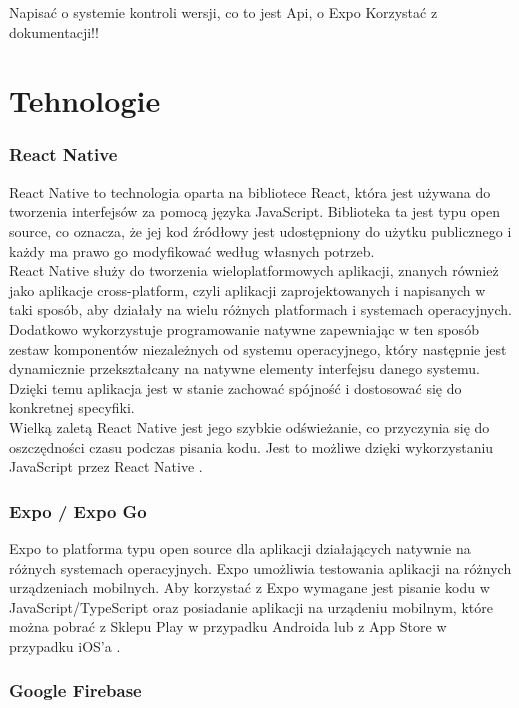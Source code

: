 Napisać o systemie kontroli wersji, co to jest Api, o Expo
Korzystać z dokumentacji!!\\

\section{Tehnologie}

\subsubsection*{\textbf{React Native}}
\phantom{Th}
React Native to technologia oparta na bibliotece React, 
która jest używana do tworzenia interfejsów za pomocą języka JavaScript. 
Biblioteka ta jest typu open source, co oznacza, że jej kod źródłowy jest udostępniony 
do użytku publicznego i każdy ma prawo go modyfikować według własnych potrzeb.\\

React Native służy do tworzenia wieloplatformowych aplikacji, znanych również jako aplikacje cross-platform, 
czyli aplikacji zaprojektowanych i napisanych w taki sposób, aby działały na wielu różnych platformach i systemach operacyjnych. 
Dodatkowo wykorzystuje programowanie natywne zapewniając w ten sposób zestaw komponentów niezależnych od systemu operacyjnego, 
który następnie jest dynamicznie przekształcany na natywne elementy interfejsu danego systemu. Dzięki temu aplikacja jest w stanie 
zachować spójność i dostosować się do  konkretnej specyfiki.\\

Wielką zaletą React Native jest jego szybkie odświeżanie, co przyczynia się do oszczędności czasu podczas pisania kodu. 
Jest to możliwe dzięki wykorzystaniu JavaScript przez React Native \cite{reactnative} .\\


\subsubsection*{\textbf{Expo / Expo Go}}
\phantom{Th}
Expo to platforma typu open source dla aplikacji działających natywnie na różnych systemach operacyjnych. 
Expo umożliwia testowania aplikacji na różnych urządzeniach mobilnych. Aby korzystać z Expo wymagane jest pisanie kodu w JavaScript/TypeScript 
oraz posiadanie aplikacji na urządeniu mobilnym, które można pobrać z Sklepu Play w przypadku Androida lub z App Store w przypadku iOS'a 
\cite{expogo} .

\subsubsection*{\textbf{Google Firebase}}
\phantom{Th}

